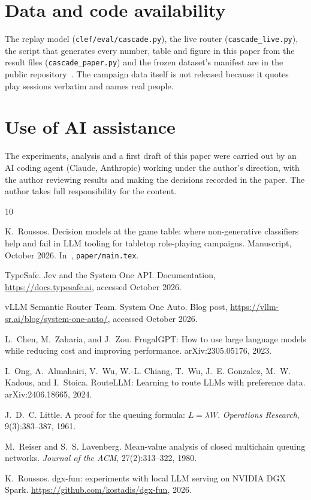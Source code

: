 \documentclass[11pt]{article}
\begin{document}
\section*{Data and code availability}
The replay model (\texttt{clef/eval/cascade.py}), the live router (\texttt{cascade\_live.py}), the
script that generates every number, table and figure in this paper from the result files
(\texttt{cascade\_paper.py}) and the frozen dataset's manifest are in the public
repository~\cite{dgxfun}. The campaign data itself is not released because it quotes play sessions
verbatim and names real people.

\section*{Use of AI assistance}
The experiments, analysis and a first draft of this paper were carried out by an AI coding agent
(Claude, Anthropic) working under the author's direction, with the author reviewing results and
making the decisions recorded in the paper. The author takes full responsibility for the content.


\begin{thebibliography}{10}

K.~Roussos.
\newblock Decision models at the game table: where non-generative classifiers help and fail in LLM
  tooling for tabletop role-playing campaigns.
\newblock Manuscript, October 2026. In~\cite{dgxfun}, \texttt{paper/main.tex}.

TypeSafe.
\newblock Jev and the System One API.
\newblock Documentation, \url{https://docs.typesafe.ai}, accessed October 2026.

vLLM Semantic Router Team.
\newblock System One Auto.
\newblock Blog post, \url{https://vllm-sr.ai/blog/system-one-auto/}, accessed October 2026.

L.~Chen, M.~Zaharia, and J.~Zou.
\newblock FrugalGPT: How to use large language models while reducing cost and improving performance.
\newblock arXiv:2305.05176, 2023.

I.~Ong, A.~Almahairi, V.~Wu, W.-L. Chiang, T.~Wu, J.~E. Gonzalez, M.~W. Kadous, and I.~Stoica.
\newblock RouteLLM: Learning to route LLMs with preference data.
\newblock arXiv:2406.18665, 2024.

J.~D.~C. Little.
\newblock A proof for the queuing formula: $L = \lambda W$.
\newblock \emph{Operations Research}, 9(3):383--387, 1961.

M.~Reiser and S.~S. Lavenberg.
\newblock Mean-value analysis of closed multichain queuing networks.
\newblock \emph{Journal of the ACM}, 27(2):313--322, 1980.

K.~Roussos.
\newblock dgx-fun: experiments with local LLM serving on NVIDIA DGX Spark.
\newblock \url{https://github.com/kostadis/dgx-fun}, 2026.

\end{thebibliography}
\end{document}
